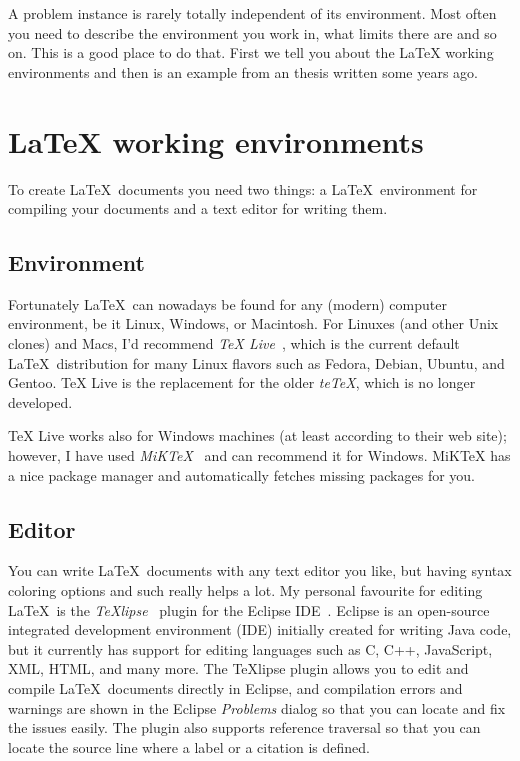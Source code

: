 \documentclass[12pt,a4paper,oneside,pdftex]{report}
\begin{document}
A problem instance is rarely totally independent of its environment.
Most often you need to describe the environment you work in, what
limits there are and so on. This is a good place to do that. First we
tell you about the LaTeX working environments and then is an example
from an thesis written some years ago.


\section{LaTeX working environments}
\label{sec:environments}

To create \LaTeX\ documents you need two things: a \LaTeX\ environment for
compiling your documents and a text editor for writing them.

\subsection{Environment}

Fortunately \LaTeX\ can nowadays be found for any (modern) computer
environment, be it Linux, Windows, or Macintosh.
For Linuxes (and other Unix clones) and Macs, I'd recommend \emph{TeX
Live}~\cite{TeXLive}, which is the current default \LaTeX\ distribution for
many Linux flavors such as Fedora, Debian, Ubuntu, and Gentoo.
TeX Live is the replacement for the older \emph{teTeX}, which is
no longer developed.

TeX Live works also for Windows machines (at least according to their web
site); however, I have used \emph{MiKTeX}~\cite{MiKTeX} and can recommend it
for Windows.
MiKTeX has a nice package manager and automatically fetches missing packages
for you.

\subsection{Editor}

You can write \LaTeX\ documents with any text editor you like, but having
syntax coloring options and such really helps a lot.
My personal favourite for editing \LaTeX\ is the
\emph{TeXlipse}~\cite{TeXlipse} plugin for the Eclipse IDE~\cite{Eclipse}.
Eclipse is an open-source integrated development environment (IDE) initially
created for writing Java code, but it currently has support for editing
languages such as C, C++, JavaScript, XML, HTML, and many more.
The TeXlipse plugin allows you to edit and compile \LaTeX\ documents directly
in Eclipse, and compilation errors and warnings are shown in the Eclipse
\emph{Problems} dialog so that you can locate and fix the issues easily.
The plugin also supports reference traversal so that you can locate the source
line where a label or a citation is defined.
\end{document}
